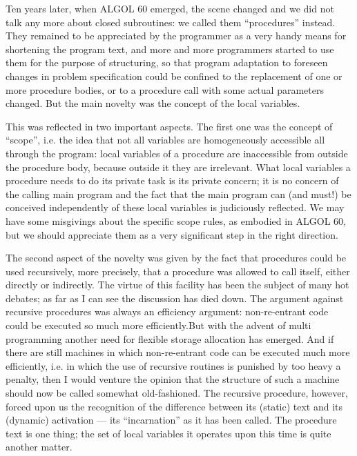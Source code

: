 Ten years later, when ALGOL 60 emerged, the scene changed and we did not talk any more about closed subroutines: we called them ``procedures'' instead. They remained to be appreciated by the programmer as a very handy means for shortening the program text, and more and more programmers started to use them for the purpose of structuring, so that program adaptation to foreseen changes in problem specification could be confined to the replacement of one or more procedure bodies, or to a procedure call with some actual parameters changed. But the main novelty was the concept of the local variables.

This was reflected in two important aspects. The first one was the concept of ``scope'', i.e. the idea that not all variables are homogeneously accessible all through the program: local variables of a procedure are inaccessible from  outside the procedure body, because outside it they are irrelevant. What local variables a procedure needs to do its private task is its private concern; it is no concern of the calling main program and the fact that the main program can (and must!) be conceived independently of these local variables is judiciously reflected. We may have some misgivings about the specific scope rules, as embodied in ALGOL 60, but we should appreciate them as a very significant step in the right direction.

The second aspect of the novelty was given by the fact that procedures could be used recursively, more precisely, that a procedure was allowed to call itself, either directly or indirectly. The virtue of this facility has been the subject of many hot debates; as far as I can see the discussion has died down. The argument against recursive procedures was always an efficiency argument: non-re-entrant code could be executed so much more efficiently.But with the advent of multi programming another need for flexible storage allocation has emerged. And if there are still machines in which non-re-entrant code can be executed much more efficiently, i.e. in which the use of recursive routines is punished by too heavy a penalty, then I would venture the opinion that the structure of such a machine should now be called somewhat old-fashioned. The recursive procedure, however, forced upon us the recognition of the difference between its (static) text and its (dynamic) activation --- its ``incarnation'' as it has been called. The procedure text is one thing; the set of local variables it operates upon this time is quite another matter.

